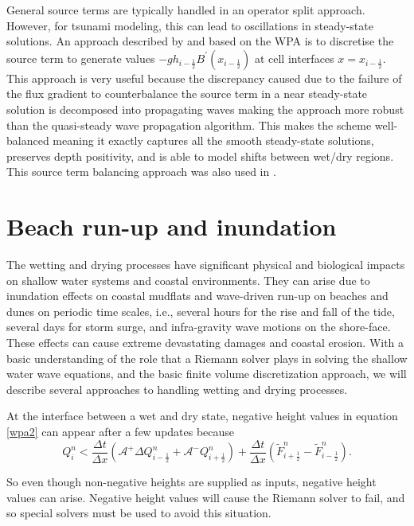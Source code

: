 \documentclass[9pt,a4paper]{article}
\begin{document}
	
	General source terms are typically handled in an operator split approach.  However, for tsunami modeling, this can lead to oscillations in steady-state solutions.  An approach described by  \citet{ba-le-mi-ro:2003} and based on the WPA is to discretise the source term to generate values $-gh_{i-\frac{1}{2}}B^{\prime}(x_{i-\frac{1}{2}})$ at  cell interfaces  $x = x_{i-\frac{1}{2}}$. This approach is very useful because the discrepancy caused due to the failure of the flux gradient to counterbalance the source term in a near steady-state solution is decomposed into propagating waves  making the approach more robust than the quasi-steady wave propagation algorithm.  This makes the scheme well-balanced  meaning it exactly captures all the smooth steady-state solutions, preserves depth positivity, and is able to model shifts between wet/dry regions. This source term balancing approach was also used in  \citet{chaabelasri1849simple}. 
	
	
	\section{Beach run-up and inundation}
	The wetting and drying processes have significant physical and biological impacts on shallow water systems and coastal environments. They can arise due to inundation effects on coastal mudflats and wave-driven run-up on beaches and dunes on periodic time scales, i.e., several hours for the rise and fall of the tide, several days for storm surge, and infra-gravity wave motions on the shore-face.  These effects can cause extreme devastating damages and coastal erosion.
	With a basic understanding of the role that a Riemann solver plays in solving the shallow water wave equations, and the basic finite volume discretization approach, we will describe several approaches to handling wetting and drying processes.  
	
	At the interface between a wet and dry state, negative height values in equation \eqref{wpa2} can appear after a few updates because
	\begin{equation}
		Q_{i}^{n} < \frac{\Delta t}{\Delta x}(\mathcal{A^{+}}\Delta 	Q_{i-\frac{1}{2}}^{n} + \mathcal{A^{-}}Q_{i+\frac{1}{2}}^{n}) + \frac{\Delta t}{\Delta x} (\tilde{F}_{i+\frac{1}{2}}^{n} - \tilde{F}_{i-\frac{1}{2}}^{n} ).
		\label{wpa22}
	\end{equation}
	
	So even though non-negative heights are supplied as inputs, negative height values can arise.  Negative height values will cause the Riemann solver to fail, and so special solvers must be used to avoid this situation.
	
\end{document}
